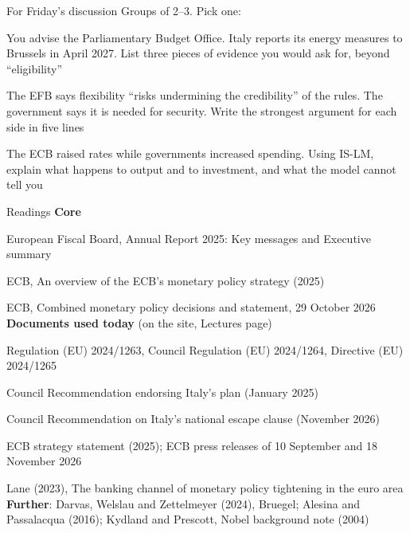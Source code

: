 \documentclass[aspectratio=169,xcolor=table]{beamer}
\begin{document}
\begin{frame}{For Friday's discussion}
\small
Groups of 2--3. Pick one:
\be
  \item You advise the Parliamentary Budget Office. Italy reports its energy measures to Brussels in April 2027. List three pieces of evidence you would ask for, beyond ``eligibility''
  \item The EFB says flexibility ``risks undermining the credibility'' of the rules. The government says it is needed for security. Write the strongest argument for each side in five lines
  \item The ECB raised rates while governments increased spending. Using IS-LM, explain what happens to output and to investment, and what the model cannot tell you
\ee
\end{frame}

\begin{frame}{Readings}
\footnotesize
\textbf{Core}
\bi
  \item European Fiscal Board, Annual Report 2025: Key messages and Executive summary
  \item ECB, An overview of the ECB's monetary policy strategy (2025)
  \item ECB, Combined monetary policy decisions and statement, 29 October 2026
\ei
\textbf{Documents used today} (on the site, Lectures page)
\bi
  \item Regulation (EU) 2024/1263, Council Regulation (EU) 2024/1264, Directive (EU) 2024/1265
  \item Council Recommendation endorsing Italy's plan (January 2025)
  \item Council Recommendation on Italy's national escape clause (November 2026)
  \item ECB strategy statement (2025); ECB press releases of 10 September and 18 November 2026
  \item Lane (2023), The banking channel of monetary policy tightening in the euro area
\ei
\textbf{Further}: Darvas, Welslau and Zettelmeyer (2024), Bruegel; Alesina and Passalacqua (2016); Kydland and Prescott, Nobel background note (2004)
\end{frame}

\pelQuestions
\end{document}
